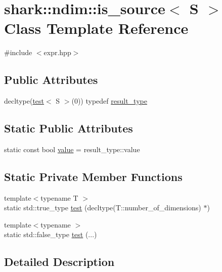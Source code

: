 \hypertarget{classshark_1_1ndim_1_1is__source}{}\section{shark\+:\+:ndim\+:\+:is\+\_\+source$<$ S $>$ Class Template Reference}
\label{classshark_1_1ndim_1_1is__source}


{\ttfamily \#include $<$expr.\+hpp$>$}

\subsection*{Public Attributes}
\begin{DoxyCompactItemize}
\item 
decltype(\hyperlink{classshark_1_1ndim_1_1is__source_a3aae092d2fe4e1593d3997fa4c33c27b}{test}$<$ S $>$(0)) typedef \hyperlink{classshark_1_1ndim_1_1is__source_a8f572031c798bd5661798790582835b2}{result\+\_\+type}
\end{DoxyCompactItemize}
\subsection*{Static Public Attributes}
\begin{DoxyCompactItemize}
\item 
static const bool \hyperlink{classshark_1_1ndim_1_1is__source_a454596d26b3920a0a3e99ebc76362e7c}{value} = result\+\_\+type\+::value
\end{DoxyCompactItemize}
\subsection*{Static Private Member Functions}
\begin{DoxyCompactItemize}
\item 
{\footnotesize template$<$typename T $>$ }\\static std\+::true\+\_\+type \hyperlink{classshark_1_1ndim_1_1is__source_a3aae092d2fe4e1593d3997fa4c33c27b}{test} (decltype(T\+::number\+\_\+of\+\_\+dimensions) $\ast$)
\item 
{\footnotesize template$<$typename $>$ }\\static std\+::false\+\_\+type \hyperlink{classshark_1_1ndim_1_1is__source_a43983e36462efe2c8ff1a5be7e1b30af}{test} (...)
\end{DoxyCompactItemize}


\subsection{Detailed Description}
